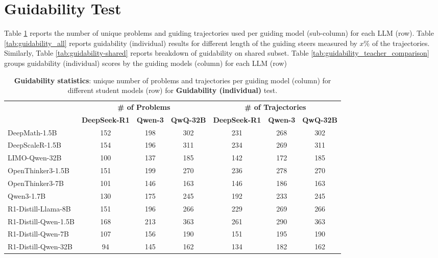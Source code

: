 \documentclass{article} %
\begin{document}
\section{Guidability Test}
\label{sec:appendix_guidability_test}

Table \ref{tab:guidability_support_statistics} reports the number of unique problems and guiding trajectories used per guiding model (sub-column) for each LLM (row). Table \ref{tab:guidability_all} reports guidability (individual) results for different length of the guiding steers measured by $x\%$ of the trajectories. Similarly, Table \ref{tab:guidability-shared} reports breakdown of guidability on shared subset. Table \ref{tab:guidability_teacher_comparison} groups guidability (individual) scores by the guiding models (column) for each LLM (row)

\begin{table}[ht!]
\centering
\small
\begin{tabular}{l|ccc|ccc}
\toprule
 & \multicolumn{3}{c|}{\textbf{\# of Problems}} & \multicolumn{3}{c}{\textbf{\# of Trajectories}} \\
 & \textbf{DeepSeek-R1} & \textbf{Qwen-3} & \textbf{QwQ-32B} & \textbf{DeepSeek-R1} & \textbf{Qwen-3} & \textbf{QwQ-32B} \\
\midrule
DeepMath-1.5B          & 152 & 198 & 302 & 231 & 268 & 302 \\
DeepScaleR-1.5B        & 154 & 196 & 311 & 234 & 269 & 311 \\
LIMO-Qwen-32B          & 100 & 137 & 185 & 142 & 172 & 185 \\
OpenThinker3-1.5B      & 151 & 199 & 270 & 236 & 278 & 270 \\
OpenThinker3-7B        & 101 & 146 & 163 & 146 & 186 & 163 \\
Qwen3-1.7B             & 130 & 175 & 245 & 192 & 233 & 245 \\
\midrule
R1-Distill-Llama-8B    & 151 & 196 & 266 & 229 & 269 & 266 \\
R1-Distill-Qwen-1.5B   & 168 & 213 & 363 & 261 & 290 & 363 \\
R1-Distill-Qwen-7B     & 107 & 156 & 190 & 151 & 195 & 190 \\
R1-Distill-Qwen-32B    &  94 & 145 & 162 & 134 & 182 & 162 \\
\bottomrule
\end{tabular}
\caption{\textbf{Guidability statistics}: unique number of problems and trajectories per guiding model (column) for different student models (row) for \textbf{Guidability (individual)} test.}
\label{tab:guidability_support_statistics}
\end{table}
\end{document}
